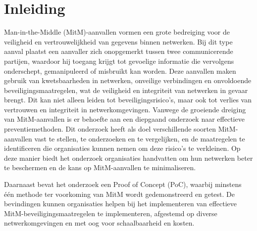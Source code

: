 


% 

\section{Inleiding}%
\label{sec:inleiding}

Man-in-the-Middle (MitM)-aanvallen vormen een grote bedreiging voor de veiligheid en vertrouwelijkheid van gegevens binnen netwerken. Bij dit type aanval plaatst een aanvaller zich onopgemerkt tussen twee communicerende partijen, waardoor hij toegang krijgt tot gevoelige informatie die vervolgens onderschept, gemanipuleerd of misbruikt kan worden. Deze aanvallen maken gebruik van kwetsbaarheden in netwerken, onveilige verbindingen en onvoldoende beveiligingsmaatregelen, wat de veiligheid en integriteit van netwerken in gevaar brengt. Dit kan niet alleen leiden tot beveiligingsrisico’s, maar ook tot verlies van vertrouwen en integriteit in netwerkomgevingen.
Vanwege de groeiende dreiging van MitM-aanvallen is er behoefte aan een diepgaand onderzoek naar effectieve preventiemethoden. Dit onderzoek heeft als doel verschillende soorten MitM-aanvallen vast te stellen, te onderzoeken en te vergelijken, en de maatregelen te identificeren die organisaties kunnen nemen om deze risico’s te verkleinen. Op deze manier biedt het onderzoek organisaties handvatten om hun netwerken beter te beschermen en de kans op MitM-aanvallen te minimaliseren.

Daarnaast bevat het onderzoek een Proof of Concept (PoC), waarbij minstens één methode ter voorkoming van MitM wordt gedemonstreerd en getest. De bevindingen kunnen organisaties helpen bij het implementeren van effectieve MitM-beveiligingsmaatregelen te implementeren, afgestemd op diverse netwerkomgevingen en met oog voor schaalbaarheid en kosten.

